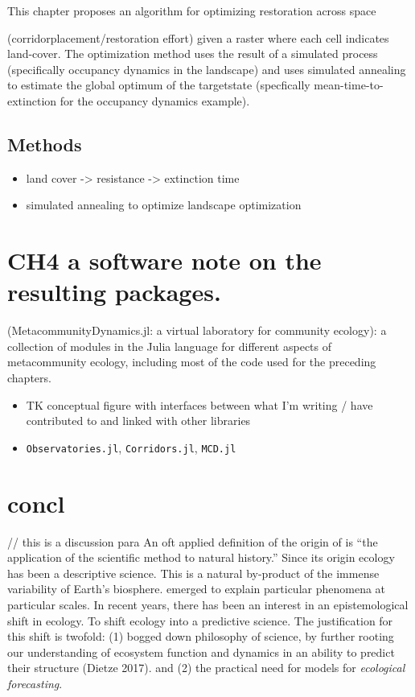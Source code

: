 \documentclass[11pt]{article}
\begin{document}
This chapter proposes an algorithm for optimizing restoration across
space

(corridorplacement/restoration effort) given a raster where each cell
indicates land-cover. The optimization method uses the result of a
simulated process (specifically occupancy dynamics in the landscape) and
uses simulated annealing to estimate the global optimum of the
targetstate (specfically mean-time-to-extinction for the occupancy
dynamics example).

\hypertarget{methods-2}{%
\subsection{Methods}\label{methods-2}}

\begin{itemize}
\tightlist
\item
  land cover -\textgreater{} resistance -\textgreater{} extinction time
\item
  simulated annealing to optimize landscape optimization
\end{itemize}

\hypertarget{ch4-a-software-note-on-the-resulting-packages.}{%
\section{CH4 a software note on the resulting
packages.}\label{ch4-a-software-note-on-the-resulting-packages.}}

(MetacommunityDynamics.jl: a virtual laboratory for community ecology):
a collection of modules in the Julia language for different aspects of
metacommunity ecology, including most of the code used for the preceding
chapters.

\begin{itemize}
\item
  TK conceptual figure with interfaces between what I'm writing / have
  contributed to and linked with other libraries
\item
  \texttt{Observatories.jl}, \texttt{Corridors.jl}, \texttt{MCD.jl}
\end{itemize}

\hypertarget{concl}{%
\section{concl}\label{concl}}

// this is a discussion para An oft applied definition of the origin of
is ``the application of the scientific method to natural history.''
Since its origin ecology has been a descriptive science. This is a
natural by-product of the immense variability of Earth's biosphere.
emerged to explain particular phenomena at particular scales. In recent
years, there has been an interest in an epistemological shift in
ecology. To shift ecology into a predictive science. The justification
for this shift is twofold: (1) bogged down philosophy of science, by
further rooting our understanding of ecosystem function and dynamics in
an ability to predict their structure (Dietze 2017). and (2) the
practical need for models for \emph{ecological forecasting}.
\end{document}
